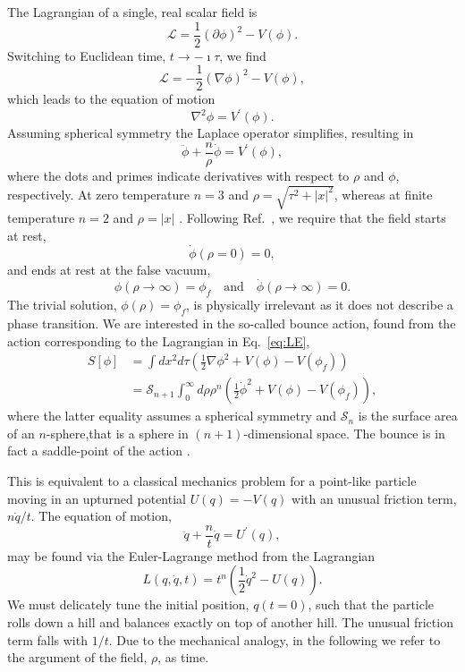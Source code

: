 \documentclass[final,3p,11pt,pdflatex]{elsarticle}
\renewcommand{\tfrac}{\frac}
\renewcommand{\refeq}[1]{Eq.~\ref{#1}}
\newcommand{\refcite}[1]{Ref.~\cite{#1}}
\newcommand{\fv}{\ensuremath{\phi_f}}
\begin{document}
The Lagrangian of a single, real scalar field is
\begin{equation}
\mathcal{L} = \tfrac12 (\partial\phi)^2 - V(\phi).
\end{equation}
Switching to Euclidean time, $t \to -\imath \tau$, we find
\begin{equation}\label{eq:LE}
\mathcal{L} = -\tfrac12 (\nabla\phi)^2 - V(\phi),
\end{equation}
which leads to the equation of motion
\begin{equation}
\nabla^2 \phi = V^\prime(\phi).
\end{equation}
Assuming spherical symmetry the Laplace operator simplifies, resulting in
\begin{equation}\label{eq:one_dim_bounce}
\ddot \phi + \tfrac{n}{\rho}\dot\phi = V^\prime(\phi),
\end{equation}
where the dots and primes indicate derivatives with respect to $\rho$ and
$\phi$, respectively.  At zero temperature $n=3$ and
$\rho = \sqrt{\tau^2 + |x|^2}$, whereas at finite temperature $n=2$ and
$\rho = |x|$ \cite{Linde:1981zj}.
Following \refcite{Coleman:1977py}, we require that the field starts at rest,
\begin{equation}\label{eq:bcon1}
\dot\phi(\rho = 0) = 0,
\end{equation}
and ends at rest at the false vacuum,
\begin{equation}\label{eq:bcon2}
\phi(\rho \to \infty) = \fv \quad\text{and}\quad \dot\phi(\rho \to \infty) = 0.
\end{equation}
The trivial solution, $\phi(\rho) = \fv$, is physically irrelevant as it does not describe a phase transition.  We are interested in the so-called bounce action, found from the action corresponding to the Lagrangian in \refeq{eq:LE},
\begin{align}\label{eq:action}
S[\phi] &= \int dx^2 d\tau \left(\tfrac12\nabla\phi^2 + V(\phi) - V(\fv) \right)\\
        &= \mathcal{S}_{n + 1} \int_0^\infty d\rho \rho^n \left(\tfrac12\dot\phi^2 + V(\phi) - V(\fv) \right),
\end{align}
where the latter equality assumes a spherical symmetry and $\mathcal{S}_n$ is the surface area of an $n$-sphere,that is a sphere in $(n+1)$-dimensional space.  The bounce is in fact a saddle-point of the action \cite{Coleman:1987rm}.

This is equivalent to a classical mechanics problem for a point-like particle moving in an upturned potential $U(q) = -V(q)$ with an unusual friction term, $n\dot q/t$.  The equation of motion,
\begin{equation}
   \ddot q + \tfrac{n}{t}\dot q = U^\prime(q),
\end{equation}
may be found via the Euler-Lagrange method from the Lagrangian
\begin{equation}
    L(q, \dot q, t) = t^n \left(\tfrac12\dot q^2 - U(q)\right).
\end{equation}
We must delicately tune the initial position, $q(t=0)$, such that the particle rolls down a hill and balances exactly on top of another hill.  The unusual friction term falls with $1/t$.
%
Due to the mechanical analogy, in the following we refer to the argument of the field, $\rho$, as time.
\end{document}

